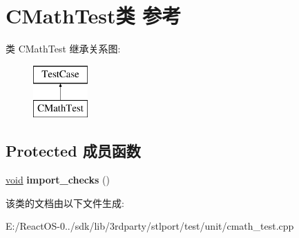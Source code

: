 \hypertarget{class_c_math_test}{}\section{C\+Math\+Test类 参考}
\label{class_c_math_test}
类 C\+Math\+Test 继承关系图\+:\begin{figure}[H]
\begin{center}
\leavevmode
\includegraphics[height=2.000000cm]{class_c_math_test}
\end{center}
\end{figure}
\subsection*{Protected 成员函数}
\begin{DoxyCompactItemize}
\item 
\mbox{\label{class_c_math_test_a56238cb0259b282ff0c2df5f9259d730}} 
\hyperlink{interfacevoid}{void} {\bfseries import\+\_\+checks} ()
\end{DoxyCompactItemize}


该类的文档由以下文件生成\+:\begin{DoxyCompactItemize}
\item 
E\+:/\+React\+O\+S-\/0../sdk/lib/3rdparty/stlport/test/unit/cmath\+\_\+test.\+cpp\end{DoxyCompactItemize}
